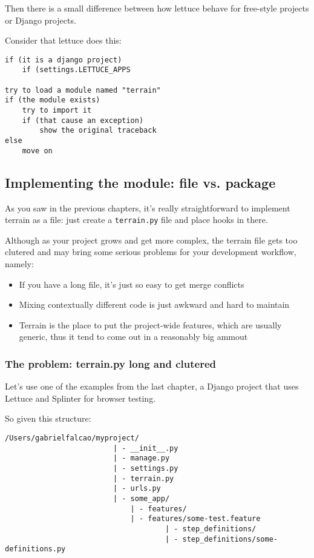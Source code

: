 \documentclass[letterpaper]{article}
\begin{document}
\noindent
Then there is a small difference between how lettuce behave for
free-style projects or Django projects.

\noindent
Consider that lettuce does this:

\footnotesize
\begin{verbatim}
if (it is a django project)
    if (settings.LETTUCE_APPS

try to load a module named "terrain"
if (the module exists)
    try to import it
    if (that cause an exception)
        show the original traceback
else
    move on
\end{verbatim}

\normalsize

\subsection*{Implementing the module: file vs. package}

As you saw in the previous chapters, it's really straightforward to
implement terrain as a file: just create a \texttt{terrain.py} file
and place hooks in there.

Although as your project grows and get more complex, the terrain file gets too clutered and may bring some serious problems for your development workflow, namely:

\begin{itemize}
\item{If you have a long file, it's just so easy to get merge conflicts}
\item{Mixing contextually different code is just awkward and hard to maintain}
\item{Terrain is the place to put the project-wide features, which are usually generic, thus it tend to come out in a reasonably big ammout}
\end{itemize}

\subsubsection*{The problem: terrain.py long and clutered}

Let's use one of the examples from the last chapter, a Django project
that uses Lettuce and Splinter for browser testing.

\noindent
So given this structure:

\footnotesize
\begin{verbatim}
/Users/gabrielfalcao/myproject/
                         | - __init__.py
                         | - manage.py
                         | - settings.py
                         | - terrain.py
                         | - urls.py
                         | - some_app/
                             | - features/
                             | - features/some-test.feature
                                     | - step_definitions/
                                     | - step_definitions/some-definitions.py
\end{verbatim}
\normalsize
\end{document}
